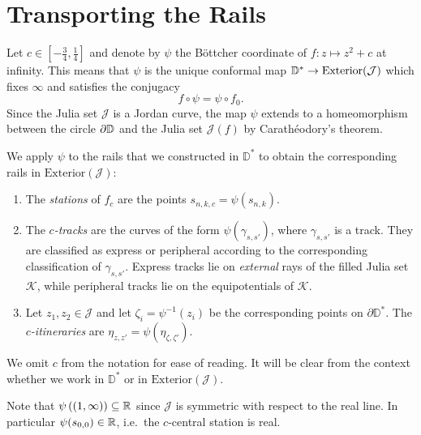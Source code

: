 	
\section{Transporting the Rails} \label{rails-section}
Let $c\in\left[-\frac 34,\frac{1}{4}\right]$ and denote by $\psi$ the Böttcher coordinate of $f: z\mapsto z^2+c$ at infinity. 
This means that $\psi$ is the unique conformal map $\mathbb{D}^{*}\to\mathrm{Exterior}(\mathcal{J})$  which fixes $\infty$ and satisfies the conjugacy $$f\circ\psi=\psi\circ f_{0}.$$
Since the Julia set $\mathcal J$ is a Jordan curve, the map $\psi$ extends to a homeomorphism between the circle $\partial\mathbb{D}$ and the Julia set $\mathcal{J}(f)$ by Carathéodory's
theorem.

We apply $\psi$ to the rails that we constructed in $\mathbb D^*$ to obtain the corresponding rails in $\mathrm{Exterior}(\mathcal{J})$:
\begin{definition} \leavevmode
\begin{enumerate}
	\item The 	\emph{stations} of $f_c$ are the points  $s_{n,k,c}=\psi(s_{n,k})$.


\item The \emph{$c$-tracks} are the curves of the form $\psi \left(\gamma_{s,s'}\right)$, where $\gamma_{s,s'}$ is a track. They are classified as express or peripheral according to the corresponding classification of $\gamma_{s,s'}$. 
Express tracks lie on \emph{external} rays of the filled Julia set $\mathcal K$, while peripheral tracks lie on the equipotentials of $\mathcal K$.

\item Let $z_1,z_2\in \mathcal J$ and let $\zeta_i=\psi^{-1}(z_i)$ be the corresponding points on $\partial \mathbb D^*$. 
The \emph{$c$-itineraries} are $\eta_{z,z'}=\psi(\eta_{\zeta,\zeta'})$.
\end{enumerate}

We omit $c$ from the notation for ease of reading. It will be clear from the context whether we work in $\mathbb D^*$ or in $\mathrm{Exterior}(\mathcal J)$.

\end{definition}

Note that $\psi\left((1,\infty)\right)\subseteq\mathbb{R}$ since $\mathcal{J}$ is symmetric with respect to the real line. In particular $\psi(s_{0,0})\in\mathbb{R}$, i.e.\ the $c$-central station is real.

